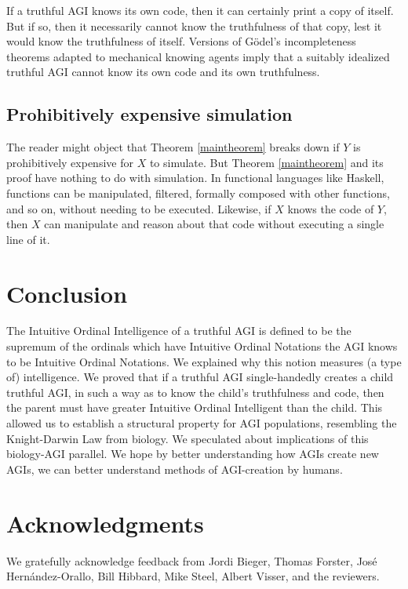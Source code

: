 \documentclass[runningheads]{llncs}
\begin{document}
If a truthful AGI knows its own code,
then it can certainly print a copy of itself.
But if so, then it necessarily cannot know the truthfulness of that
copy, lest it would know the truthfulness of itself.
Versions of G\"odel's incompleteness theorems adapted \cite{reinhardt1985absolute} to
mechanical knowing agents imply that a suitably idealized truthful AGI cannot know
its own code
and its own truthfulness.

\subsection{Prohibitively expensive simulation}

The reader might object that Theorem \ref{maintheorem} breaks down if $Y$ is prohibitively
expensive for $X$ to simulate. But Theorem \ref{maintheorem} and its
proof have nothing to do with simulation. In functional languages like
Haskell, functions can be manipulated, filtered,
formally composed with other functions, and so on, without needing
to be executed.
Likewise, if $X$ knows the code
of $Y$, then $X$ can manipulate and reason about that code without executing a single line
of it.



\section{Conclusion}
\label{conclusionsection}

The Intuitive Ordinal Intelligence of a truthful AGI is defined to be the supremum of the
ordinals which have Intuitive Ordinal Notations the AGI knows to be Intuitive Ordinal
Notations. We explained why this notion measures (a type of) intelligence.
We proved that if a truthful AGI single-handedly creates
a child truthful AGI, in such a way as to know the child's truthfulness and code,
then the parent must have greater Intuitive Ordinal Intelligent than the child. This
allowed us to establish a structural property for AGI populations,
resembling the Knight-Darwin
Law from biology. We speculated about implications of this biology-AGI parallel.
We hope by better understanding
how AGIs create new AGIs, we can better
understand methods of AGI-creation by humans.

\section*{Acknowledgments}

We gratefully acknowledge feedback from Jordi Bieger, Thomas Forster, Jos{\'e} Hern{\'a}ndez-Orallo,
Bill Hibbard, Mike Steel,
Albert Visser, and the reviewers.



\end{document}
